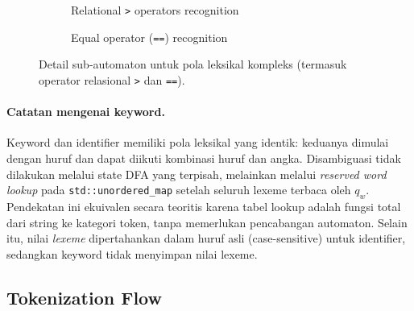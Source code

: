 \documentclass[11pt,a4paper]{article}
\begin{document}
\begin{figure}[p]
\begin{subfigure}[t]{0.48\textwidth}
\caption{Relational \texttt{>} operators recognition}
\end{subfigure}
\hfill
\begin{subfigure}[t]{0.48\textwidth}
\centering
{}
\caption{Equal operator (\texttt{==}) recognition}
\end{subfigure}

\caption{Detail sub-automaton untuk pola leksikal kompleks (termasuk operator relasional \texttt{>} dan \texttt{==}).}
\label{fig:dfa-detail}
\end{figure}

\paragraph{Catatan mengenai keyword.}
Keyword dan identifier memiliki pola leksikal yang identik: keduanya dimulai
dengan huruf dan dapat diikuti kombinasi huruf dan angka.
Disambiguasi tidak dilakukan melalui state DFA yang terpisah, melainkan melalui
\textit{reserved word lookup} pada \texttt{std::unordered\_map} setelah seluruh
lexeme terbaca oleh $q_w$. Pendekatan ini ekuivalen secara teoritis karena tabel
lookup adalah fungsi total dari string ke kategori token, tanpa memerlukan
pencabangan automaton.
Selain itu, nilai \textit{lexeme} dipertahankan dalam huruf asli (case-sensitive)
untuk identifier, sedangkan keyword tidak menyimpan nilai lexeme.

\subsection{Tokenization Flow}
\end{document}
